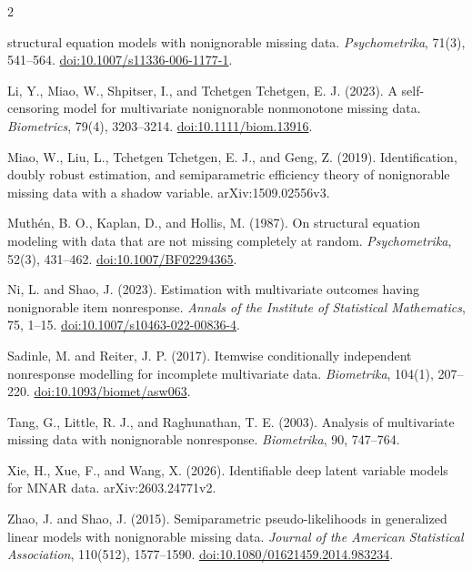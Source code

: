 \documentclass[a4paper,10pt]{article}
\begin{document}
\begin{multicols}{2}
\begin{enumerate}[label={[\arabic*]},leftmargin=7mm,itemsep=0.35em,topsep=0.2em,
  parsep=0pt,partopsep=0pt]
structural equation models with nonignorable missing data.
\textit{Psychometrika}, 71(3), 541--564.
\href{https://doi.org/10.1007/s11336-006-1177-1}{doi:10.1007/s11336-006-1177-1}.
\item Li, Y., Miao, W., Shpitser, I., and Tchetgen Tchetgen, E. J. (2023).
A self-censoring model for multivariate nonignorable nonmonotone missing data.
\textit{Biometrics}, 79(4), 3203--3214.
\href{https://doi.org/10.1111/biom.13916}{doi:10.1111/biom.13916}.
\item Miao, W., Liu, L., Tchetgen Tchetgen, E. J., and Geng, Z. (2019).
Identification, doubly robust estimation, and semiparametric efficiency theory
of nonignorable missing data with a shadow variable. arXiv:1509.02556v3.
\item Muth\'en, B. O., Kaplan, D., and Hollis, M. (1987). On structural
equation modeling with data that are not missing completely at random.
\textit{Psychometrika}, 52(3), 431--462.
\href{https://doi.org/10.1007/BF02294365}{doi:10.1007/BF02294365}.
\item Ni, L. and Shao, J. (2023). Estimation with multivariate outcomes having
nonignorable item nonresponse. \textit{Annals of the Institute of Statistical
Mathematics}, 75, 1--15.
\href{https://doi.org/10.1007/s10463-022-00836-4}{doi:10.1007/s10463-022-00836-4}.
\item Sadinle, M. and Reiter, J. P. (2017). Itemwise conditionally independent
nonresponse modelling for incomplete multivariate data. \textit{Biometrika},
104(1), 207--220.
\href{https://doi.org/10.1093/biomet/asw063}{doi:10.1093/biomet/asw063}.
\item Tang, G., Little, R. J., and Raghunathan, T. E. (2003). Analysis of
multivariate missing data with nonignorable nonresponse. \textit{Biometrika},
90, 747--764.
\item Xie, H., Xue, F., and Wang, X. (2026). Identifiable deep latent variable
models for MNAR data. arXiv:2603.24771v2.
\item Zhao, J. and Shao, J. (2015). Semiparametric pseudo-likelihoods in
generalized linear models with nonignorable missing data. \textit{Journal of
the American Statistical Association}, 110(512), 1577--1590.
\href{https://doi.org/10.1080/01621459.2014.983234}{doi:10.1080/01621459.2014.983234}.
\end{enumerate}

\end{multicols}
\end{document}
